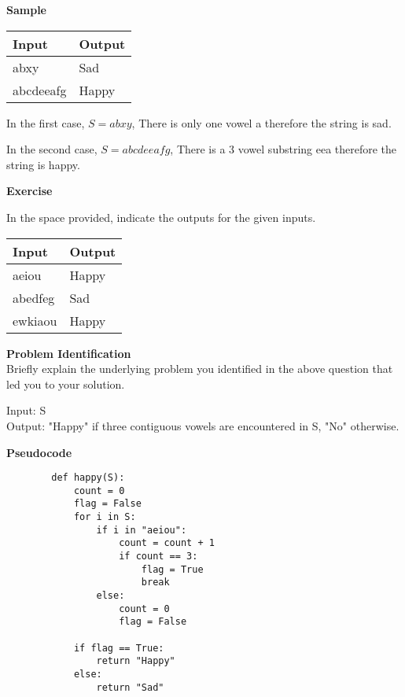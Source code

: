 \documentclass[a4paper]{exam}
\newcommand\heading[1]{\textbf{#1}}
\begin{document}
\begin{questions}
    \heading{Sample}

    \begin{tabularx}{\textwidth}{|X|X|}
        \rowcolor{gray!50}
        \hline
        Input     & Output \\ \hline\hline
        abxy      & Sad    \\\hline
        abcdeeafg & Happy  \\\hline
    \end{tabularx}

    In the first case, $S=abxy$, There is only one vowel a therefore the string is sad.

    In the second case, $S=abcdeeafg$, There is a 3 vowel substring eea therefore the string is happy.


  \heading{Exercise}

    In the space provided, indicate the outputs for the given inputs.

    \begin{tabularx}{\textwidth}{|X|X|}
        \rowcolor{gray!50}
        \hline
        Input   & Output \\ \hline\hline
        aeiou   & Happy  \\\hline
        abedfeg & Sad    \\\hline
        ewkiaou & Happy  \\\hline
    \end{tabularx}



    \heading{Problem Identification}\\
    Briefly explain the underlying problem you identified in the above question that led you to your solution.

Input: S \\
Output: "Happy" if three contiguous vowels are encountered in S, "No" otherwise.

    \heading{Pseudocode}
    \begin{verbatim}
        def happy(S):
            count = 0
            flag = False
            for i in S:
                if i in "aeiou":
                    count = count + 1
                    if count == 3:
                        flag = True 
                        break
                else:
                    count = 0
                    flag = False

            if flag == True:
                return "Happy"
            else:  
                return "Sad"


\end{verbatim}
\end{questions}
\end{document}
